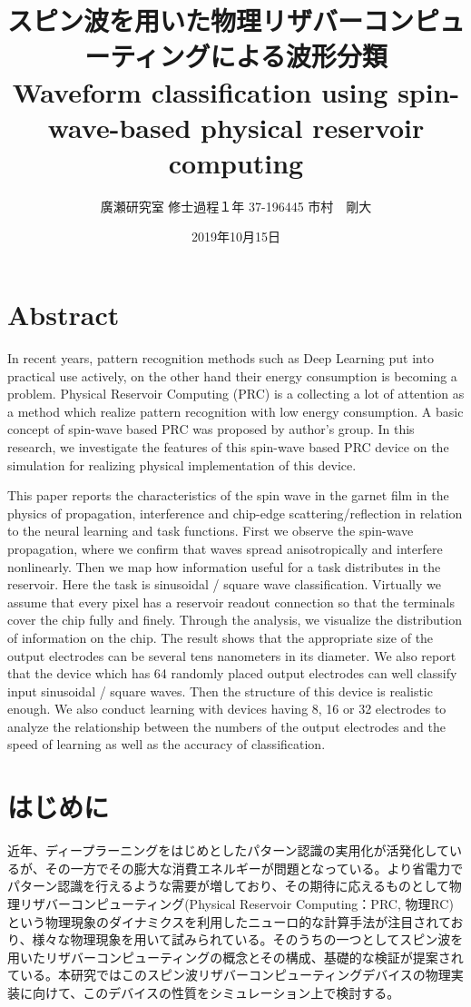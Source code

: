\documentclass[a4j, twocolumn]{jsarticle}
\title{スピン波を用いた物理リザバーコンピューティングによる波形分類\\Waveform classification using spin-wave-based physical reservoir computing}
\author{廣瀬研究室 修士過程１年 37-196445 市村　剛大}
\date{2019年10月15日}
\begin{document}

\section*{Abstract}
In recent years, pattern recognition methods such as Deep Learning put into practical use actively, on the other hand their energy consumption is becoming a problem. Physical Reservoir Computing (PRC) is a collecting a lot of attention as a method which realize pattern recognition with low energy consumption. A basic concept of spin-wave based PRC was proposed by author's group. In this research, we investigate the features of this spin-wave based PRC device on the simulation for realizing physical implementation of this device.

This paper reports the characteristics of the spin wave in the garnet film in the physics of propagation, interference and chip-edge scattering/reflection in relation to the neural learning and task functions. First we observe the spin-wave propagation, where we confirm that waves spread anisotropically and interfere nonlinearly. Then we map how information useful for a task distributes in the reservoir. Here the task is sinusoidal / square wave classification. Virtually we assume that every pixel has a reservoir readout connection so that the terminals cover the chip fully and finely. Through the analysis, we visualize the distribution of information on the chip. The result shows that the appropriate size of the output electrodes can be several tens nanometers in its diameter. We also report that the device which has 64 randomly placed output electrodes can well classify input sinusoidal / square waves. Then the structure of this device is realistic enough. We also conduct learning with devices having 8, 16 or 32 electrodes to analyze the relationship between the numbers of the output electrodes and the speed of learning as well as the accuracy of classification.

\section{はじめに}
近年、ディープラーニングをはじめとしたパターン認識の実用化が活発化しているが、その一方でその膨大な消費エネルギーが問題となっている。より省電力でパターン認識を行えるような需要が増しており、その期待に応えるものとして物理リザバーコンピューティング(Physical Reservoir Computing：PRC, 物理RC)という物理現象のダイナミクスを利用したニューロ的な計算手法が注目されており、様々な物理現象を用いて試みられている。そのうちの一つとしてスピン波を用いたリザバーコンピューティングの概念とその構成、基礎的な検証が提案されている。本研究ではこのスピン波リザバーコンピューティングデバイスの物理実装に向けて、このデバイスの性質をシミュレーション上で検討する。
\end{document}
